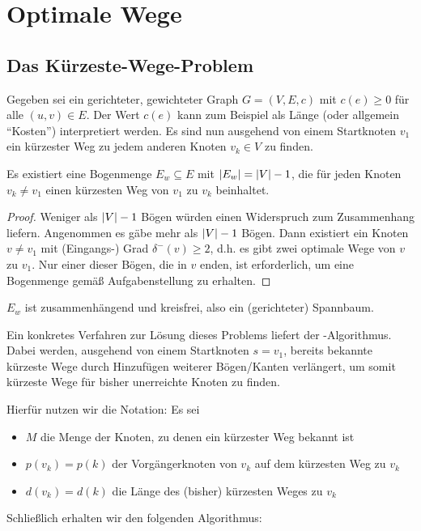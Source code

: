 \section{Optimale Wege}

\subsection{Das Kürzeste-Wege-Problem}

Gegeben sei ein gerichteter, gewichteter Graph $G = (V,E,c)$ mit $c(e) \ge 0$ für alle $(u,v) \in E$. Der Wert $c(e)$ kann zum Beispiel als Länge  (oder allgemein \enquote{Kosten}) interpretiert werden.
Es sind nun ausgehend von einem Startknoten $v_1$ ein kürzester Weg zu jedem anderen Knoten $v_k \in V$ zu finden.

\begin{aussage}
	Es existiert eine Bogenmenge $E_w \subseteq E$ mit $\left| E_w \right| = \left| V \right| - 1$, die für jeden Knoten $v_k \neq v_1$ einen kürzesten Weg von $v_1$ zu $v_k$ beinhaltet.
\end{aussage}
\begin{proof}
	Weniger als $\left| V \right| - 1$ Bögen würden einen Widerspruch zum Zusammenhang liefern. Angenommen es gäbe mehr als $\left| V \right| - 1$ Bögen. Dann existiert ein Knoten $v \neq v_1$ mit (Eingangs-) Grad $\delta^-(v) \ge 2$, d.h. es gibt zwei optimale Wege von $v$ zu $v_1$. Nur einer dieser Bögen, die in $v$ enden, ist erforderlich, um eine Bogenmenge gemäß Aufgabenstellung zu erhalten.
\end{proof}

\begin{folgerung}
	$E_w$ ist zusammenhängend und kreisfrei, also ein (gerichteter) Spannbaum.
\end{folgerung}

Ein konkretes Verfahren zur Lösung dieses Problems liefert der -Algorithmus. Dabei werden, ausgehend von einem Startknoten $s = v_1$, bereits bekannte kürzeste Wege durch Hinzufügen weiterer Bögen/Kanten verlängert, um somit kürzeste Wege für bisher unerreichte Knoten zu finden.

Hierfür nutzen wir die Notation: Es sei
\begin{itemize}[nolistsep, topsep=-\parskip]
	\item $M$ die Menge der Knoten, zu denen ein kürzester Weg bekannt ist
	\item $p(v_k) = p(k)$ der Vorgängerknoten von $v_k$ auf dem kürzesten Weg zu $v_k$
	\item $d(v_k) = d(k)$ die Länge des (bisher) kürzesten Weges zu $v_k$
\end{itemize}
Schließlich erhalten wir den folgenden Algorithmus:

